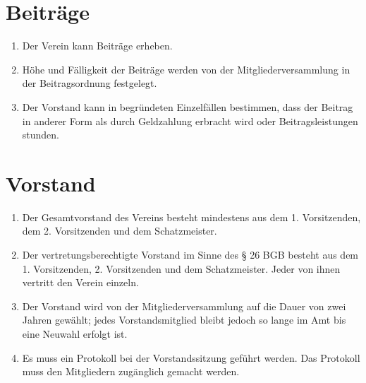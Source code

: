 \documentclass[10pt,conference,a4paper,nofonttune]{IEEEtran}
\begin{document}
\section{Beiträge}
\begin{enumerate}
  \item Der Verein kann Beiträge erheben.

  \item Höhe und Fälligkeit der Beiträge werden von der Mitgliederversammlung in
    der Beitragsordnung festgelegt.

  \item Der Vorstand kann in begründeten Einzelfällen bestimmen, dass der
    Beitrag in anderer Form als durch Geldzahlung erbracht wird oder
    Beitragsleistungen stunden.
\end{enumerate}


\section{Vorstand}
\begin{enumerate}
  \item Der Gesamtvorstand des Vereins besteht mindestens aus dem
    1. Vorsitzenden, dem 2. Vorsitzenden und dem Schatzmeister.

  \item Der vertretungsberechtigte Vorstand im Sinne des § 26 BGB besteht
    aus dem 1.  Vorsitzenden, 2. Vorsitzenden und dem Schatzmeister. Jeder von
    ihnen vertritt den Verein einzeln.

  \item Der Vorstand wird von der Mitgliederversammlung auf die Dauer von zwei
    Jahren gewählt; jedes Vorstandsmitglied bleibt jedoch so lange im Amt bis
    eine Neuwahl erfolgt ist.

  \item Es muss ein Protokoll bei der Vorstandssitzung geführt werden. Das
    Protokoll muss den Mitgliedern zugänglich gemacht werden.
\end{enumerate}
\end{document}
